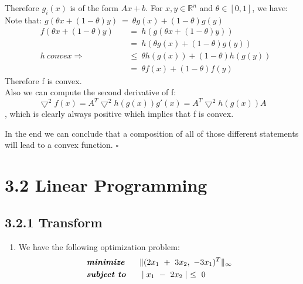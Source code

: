 \documentclass{report}
\begin{document}
\begin{enumerate}[1.]
			Therefore $g_i(x)$ is of the form $Ax + b$. For $x,y \in \mathbb{R}^n$ and $\theta \in [0,1]$, we have: \\
			Note that: $g(\theta x  + (1 - \theta) y) \ = \ \theta g(x) + (1- \theta) g(y)$
			\begin{align*}
				& f(\theta x + (1- \theta ) y) & \ & = \ h(g(\theta x  + (1 - \theta) y)) \\
				& & & = \ h(\theta g(x) + (1- \theta) g(y)) \\
				& h \ convex \Rightarrow & & \leq \ \theta h(g(x)) + (1- \theta ) h(g(y)) \\
				& & & = \ \theta f(x) + (1- \theta ) f(y)
			\end{align*}
			Therefore f is convex. \\
			Also we can compute the second derivative of f:
			\[
				\bigtriangledown ^2 f(x) = A^T \bigtriangledown ^2 h(g(x))g'(x) = A^T \bigtriangledown ^2 h(g(x)) A
			\]
			, which is clearly always positive which implies that f is convex.
		\end{enumerate}
		In the end we can conclude that a composition of all of those different statements will lead to a convex function. $\square$
	
	\section*{3.2 Linear Programming}
	\subsection*{3.2.1 Transform}
	\begin{enumerate}[]
		\item We have the following optimization problem:
		\begin{align*}
			& \textit{\textbf{minimize}} & \ & \ \| (2x_1 \ + \ 3x_2, \ -3x_1)^T \|_{\infty} \\
			& \textit{\textbf{subject to}} & \ & \ \mid x_1 \ - \ 2x_2 \mid \ \leq \ 0
		\end{align*}
	\end{enumerate}
\end{document}
